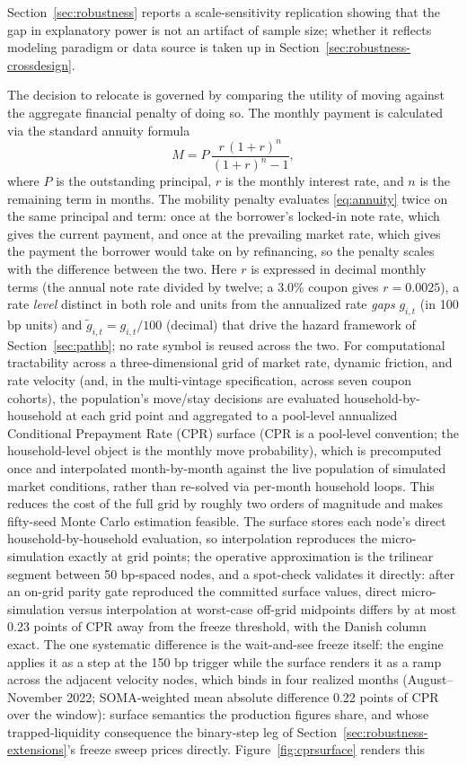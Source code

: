 \documentclass[12pt]{article}
\begin{document}
Section~\ref{sec:robustness} reports a scale-sensitivity replication showing that the gap in explanatory power is not an artifact of sample size; whether it reflects modeling paradigm or data source is taken up in Section~\ref{sec:robustness-crossdesign}.

The decision to relocate is governed by comparing the utility of moving against the aggregate financial penalty of doing so. The monthly payment is calculated via the standard annuity formula
\begin{equation}\label{eq:annuity}
M = P\,\frac{r\,(1+r)^{n}}{(1+r)^{n}-1},
\end{equation}
where $P$ is the outstanding principal, $r$ is the monthly interest rate, and $n$ is the remaining term in months. The mobility penalty evaluates \eqref{eq:annuity} twice on the same principal and term: once at the borrower's locked-in note rate, which gives the current payment, and once at the prevailing market rate, which gives the payment the borrower would take on by refinancing, so the penalty scales with the difference between the two. Here $r$ is expressed in decimal monthly terms (the annual note rate divided by twelve; a 3.0\% coupon gives $r = 0.0025$), a rate \emph{level} distinct in both role and units from the annualized rate \emph{gaps} $g_{i,t}$ (in 100 bp units) and $\tilde g_{i,t} = g_{i,t}/100$ (decimal) that drive the hazard framework of Section~\ref{sec:pathb}; no rate symbol is reused across the two. For computational tractability across a three-dimensional grid of market rate, dynamic friction, and rate velocity (and, in the multi-vintage specification, across seven coupon cohorts), the population's move/stay decisions are evaluated household-by-household at each grid point and aggregated to a pool-level annualized Conditional Prepayment Rate (CPR) surface (CPR is a pool-level convention; the household-level object is the monthly move probability), which is precomputed once and interpolated month-by-month against the live population of simulated market conditions, rather than re-solved via per-month household loops. This reduces the cost of the full grid by roughly two orders of magnitude and makes fifty-seed Monte Carlo estimation feasible. The surface stores each node's direct household-by-household evaluation, so interpolation reproduces the micro-simulation exactly at grid points; the operative approximation is the trilinear segment between 50 bp-spaced nodes, and a spot-check validates it directly: after an on-grid parity gate reproduced the committed surface values, direct micro-simulation versus interpolation at worst-case off-grid midpoints differs by at most 0.23 points of CPR away from the freeze threshold, with the Danish column exact. The one systematic difference is the wait-and-see freeze itself: the engine applies it as a step at the 150 bp trigger while the surface renders it as a ramp across the adjacent velocity nodes, which binds in four realized months (August--November 2022; SOMA-weighted mean absolute difference 0.22 points of CPR over the window): surface semantics the production figures share, and whose trapped-liquidity consequence the binary-step leg of Section~\ref{sec:robustness-extensions}'s freeze sweep prices directly. Figure~\ref{fig:cprsurface} renders this 
\end{document}
